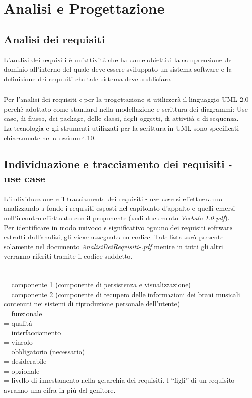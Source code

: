 \chapter{Analisi e Progettazione}
\thispagestyle{fancy} 

\section{Analisi dei requisiti}
L'analisi dei requisiti \`e un'attivit\`a che ha come obiettivi la comprensione
del dominio all'interno del quale deve essere sviluppato un sistema software e
la definizione dei requisiti che tale sistema deve soddisfare. 

\subsection{}


Per l'analisi dei
requisiti e per la progettazione si utilizzer\`a il linguaggio UML 2.0 perch\'e
adottato come standard nella modellazione e scrittura dei diagrammi: Use case,
di flusso, dei package, delle classi, degli oggetti, di attivit\`a e di sequenza.
\\
La tecnologia e gli strumenti utilizzati per la scrittura in UML
sono specificati chiaramente nella sezione 4.10.

\section{Individuazione e tracciamento dei requisiti - use case}
L'individuazione e il tracciamento dei requisiti - use case si effettueranno
analizzando a fondo i requisiti esposti nel capitolato d'appalto e quelli emersi nell'incontro effettuato con il proponente (vedi documento \emph{Verbale-1.0.pdf}).
\\
Per identificare in modo univoco e significativo ognuno dei requisiti software
estratti dall'analisi, gli viene assegnato un codice.
Tale lista sar\`a presente solamente nel documento
\emph{AnalisiDeiRequisiti-\versioneAR.pdf} mentre in tutti gli altri verranno
riferiti tramite il codice suddetto.
\\
\\
\\
 = componente 1 (componente di persistenza e visualizzazione)\\
 = componente 2 (componente di recupero delle informazioni dei brani
musicali contenuti nei sistemi di riproduzione personale dell'utente)\\
 = funzionale\\
 = qualit\`a\\
 = interfacciamento\\
 = vincolo\\
 = obbligatorio (necessario)\\
 = desiderabile\\
 = opzionale\\
 = livello di innestamento nella gerarchia dei requisiti. I ``figli'' di
un requisito avranno una cifra in pi\`u del genitore.

